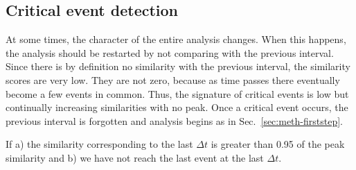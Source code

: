 \documentclass[draft]{article}
\begin{document}
\subsection{Critical event detection}
\label{sec:meth-critical}
At some times, the character of the entire analysis changes.  When
this happens, the analysis should be restarted by not comparing with
the previous interval.  Since there is by definition no similarity
with the previous interval, the similarity scores are very low.  They
are not zero, because as time passes there eventually become a few
events in common.  Thus, the signature of critical events is low but
continually increasing similarities with no peak.  Once a critical
event occurs, the previous interval is forgotten and analysis begins
as in Sec.~\ref{sec:meth-firststep}.

If a) the similarity corresponding to the last $\Delta t$ is greater
than 0.95 of the peak similarity and b) we have not reach the last
event at the last $\Delta t$.
\end{document}
